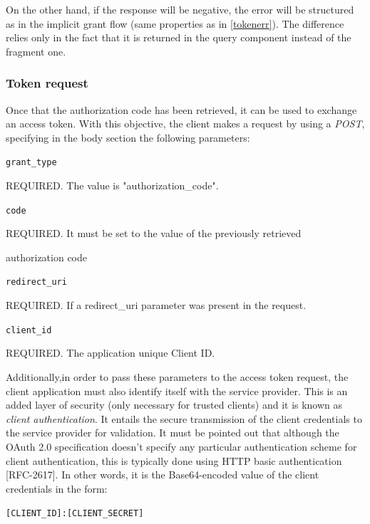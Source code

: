On the other hand, if the response will be negative, the error will be structured as in the implicit grant flow (same properties as in \ref{tokenerr}). The difference relies only in the fact that it is returned in the query component instead of the fragment one.


\subsubsection{Token request}
Once that the authorization code has been retrieved, it can be used to exchange an access token. With this objective, the client makes a request by using a \textit{POST}, specifying in the body section the following parameters:

\texttt{grant\_type}

\hspace{0.5cm}REQUIRED. The value is "authorization\_code".

\texttt{code}

\hspace{0.5cm}REQUIRED. It must be set to the value of the previously retrieved

\hspace{0.5cm}authorization code

\texttt{redirect\_uri}

\hspace{0.5cm}REQUIRED. If a redirect\_uri parameter was present in the request.

\texttt{client\_id}

\hspace{0.5cm}REQUIRED. The application unique Client ID.

\vspace{0.5cm}

Additionally,in order to pass these parameters to the access token request, the client
application must also identify itself with the service provider. This is an added
layer of security (only necessary for trusted clients) and it is known as \textit{client
authentication}.
It entails the secure transmission of the client credentials to the service provider for validation. It must be pointed out that although the OAuth 2.0 specification doesn't specify any particular authentication scheme for client authentication, this is typically done using HTTP basic authentication [RFC-2617].
In other words, it is the Base64-encoded value of the client credentials in
the form:

\hspace{0.5cm}\texttt{[CLIENT\_ID]:[CLIENT\_SECRET]}

